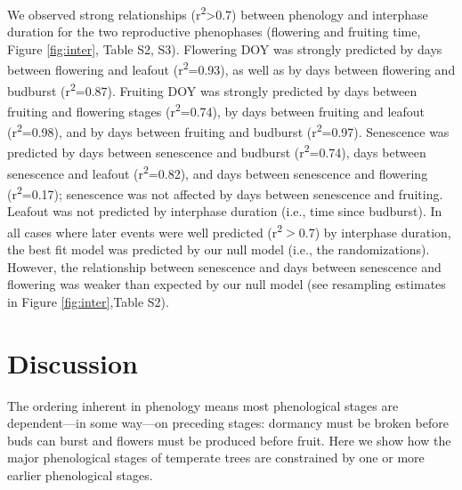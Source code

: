 \documentclass{article}
\begin{document}
\par We observed strong relationships (r\textsuperscript{2}>0.7) between phenology and interphase duration for the two reproductive phenophases (flowering and fruiting time, Figure \ref{fig:inter}, Table S2, S3). Flowering DOY was strongly predicted by days between flowering and leafout (r\textsuperscript{2}=0.93), as well as by days between flowering and budburst (r\textsuperscript{2}=0.87). Fruiting DOY was strongly predicted by days between fruiting and flowering stages (r\textsuperscript{2}=0.74), by days between fruiting and leafout (r\textsuperscript{2}=0.98), and by days between fruiting and budburst (r\textsuperscript{2}=0.97). Senescence was predicted by days between senescence and budburst (r\textsuperscript{2}=0.74), days between senescence and leafout (r\textsuperscript{2}=0.82), and days between senescence and flowering (r\textsuperscript{2}=0.17); senescence was not affected by days between senescence and fruiting.  Leafout was not predicted by interphase duration (i.e., time since budburst). In all cases where later events were well predicted (r\textsuperscript{2}$>$0.7) by interphase duration, the best fit model was predicted by our null model (i.e., the randomizations).  However, the relationship between senescence and days between senescence and flowering was weaker than expected by our null model (see resampling estimates in Figure \ref{fig:inter},Table S2).

\section* {Discussion}
\par The ordering inherent in phenology means most phenological stages are dependent---in some way---on preceding stages: dormancy must be broken before buds can burst and flowers must be produced before fruit. Here we show how the major phenological stages of temperate trees are constrained by one or more earlier phenological stages. 
\end{document}
